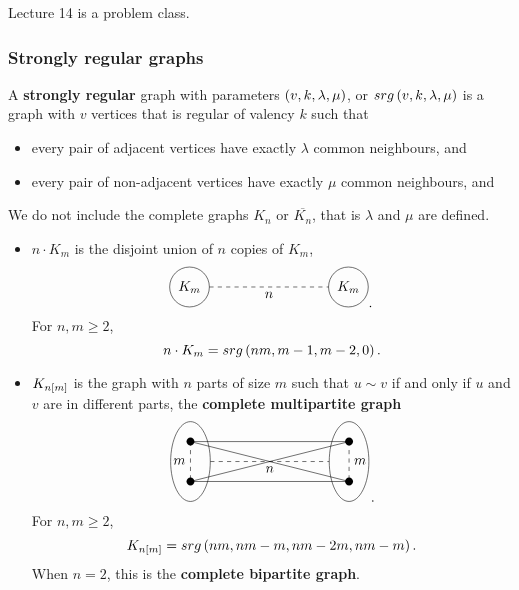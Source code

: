 
Lecture 14 is a problem class.

\pagebreak

\subsubsection{Strongly regular graphs}


\begin{definition*}
A \textbf{strongly regular} graph with parameters $ \br{v, k, \lambda, \mu} $, or $ srg\br{v, k, \lambda, \mu} $ is a graph with $ v $ vertices that is regular of valency $ k $ such that
\begin{itemize}
\item every pair of adjacent vertices have exactly $ \lambda $ common neighbours, and
\item every pair of non-adjacent vertices have exactly $ \mu $ common neighbours, and
\end{itemize}
\end{definition*}

\begin{note*}
We do not include the complete graphs $ K_n $ or $ \overline{K_n} $, that is $ \lambda $ and $ \mu $ are defined.
\end{note*}

\begin{example*}
\hfill
\begin{itemize}
\item $ n \cdot K_m $ is the disjoint union of $ n $ copies of $ K_m $,
$$
\begin{tikzpicture}
\draw (0, 0) circle (0.5) node{$ K_m $};
\draw (4, 0) circle (0.5) node{$ K_m $};
\draw [dashed] (0.5, 0) to node[below]{$ n $} (3.5, 0);
\end{tikzpicture}.
$$
For $ n, m \ge 2 $,
$$ n \cdot K_m = srg\br{nm, m - 1, m - 2, 0}. $$
\item $ K_{n\sbr{m}} $ is the graph with $ n $ parts of size $ m $ such that $ u \sim v $ if and only if $ u $ and $ v $ are in different parts, the \textbf{complete multipartite graph}
$$
\begin{tikzpicture}
\draw (0, 0) ellipse (0.5 and 1);
\fill (0, 0.5) circle (0.1);
\fill (0, -0.5) circle (0.1);
\draw [dashed] (0, 0.5) to node[left]{$ m $} (0, -0.5);
\draw (4, 0) ellipse (0.5 and 1);
\fill (4, 0.5) circle (0.1);
\fill (4, -0.5) circle (0.1);
\draw [dashed] (4, 0.5) to node[right]{$ m $} (4, -0.5);
\draw [dashed] (0.5, 0) to node[below]{$ n $} (3.5, 0);
\draw (0, 0.5) to (4, 0.5);
\draw (0, 0.5) to (4, -0.5);
\draw (0, -0.5) to (4, 0.5);
\draw (0, -0.5) to (4, -0.5);
\end{tikzpicture}.
$$
For $ n, m \ge 2 $,
$$ K_{n\sbr{m}} = srg\br{nm, nm - m, nm - 2m, nm - m}. $$
When $ n = 2 $, this is the \textbf{complete bipartite graph}.
\end{itemize}
\end{example*}

